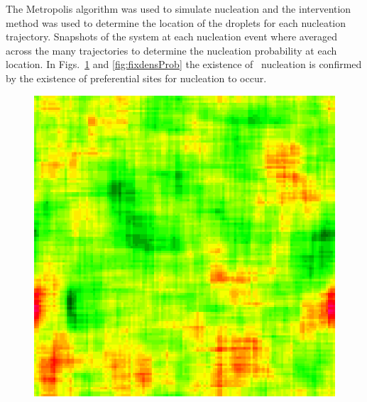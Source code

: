 The Metropolis algorithm was used to simulate nucleation  and the intervention method was used to determine the location of the droplets for each nucleation trajectory. Snapshots of the system at each nucleation event where averaged across the many trajectories to determine the nucleation probability at each location. In Figs.~\ref{fig:fixdensH} and \ref{fig:fixdensProb} the existence of \het\ nucleation is confirmed by the existence of preferential sites for nucleation to occur.   %
\begin{figure}[!h]
\centering
  \includegraphics[scale=0.35]{Figures/fix52/Fix52.png}
  \label{fig:fixdensH}
\end{figure}%

